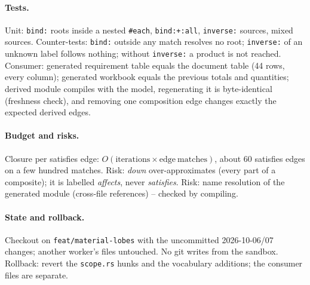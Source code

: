 \documentclass[11pt,a4paper]{article}
\begin{document}
\paragraph{Tests.} Unit: \texttt{bind:} roots inside a nested \texttt{\#each}, \texttt{bind:+:all},
\texttt{inverse:} sources, mixed sources. Counter-tests: \texttt{bind:} outside any match resolves no
root; \texttt{inverse:} of an unknown label follows nothing; without \texttt{inverse:} a product is not
reached. Consumer: generated requirement table equals the document table (44 rows, every column);
generated workbook equals the previous totals and quantities; derived module compiles with the model,
regenerating it is byte-identical (freshness check), and removing one composition edge changes exactly
the expected derived edges.
\paragraph{Budget and risks.} Closure per satisfies edge: $O(\mathrm{iterations}\times
\mathrm{edge\ matches})$, about 60 satisfies edges on a few hundred matches. Risk: \emph{down}
over-approximates (every part of a composite); it is labelled \emph{affects}, never \emph{satisfies}.
Risk: name resolution of the generated module (cross-file references) -- checked by compiling.
\paragraph{State and rollback.} Checkout on \texttt{feat/material-lobes} with the uncommitted
2026-10-06/07 changes; another worker's files untouched. No git writes from the sandbox. Rollback:
revert the \texttt{scope.rs} hunks and the vocabulary additions; the consumer files are separate.
\begin{center}\end{center}
\end{document}
